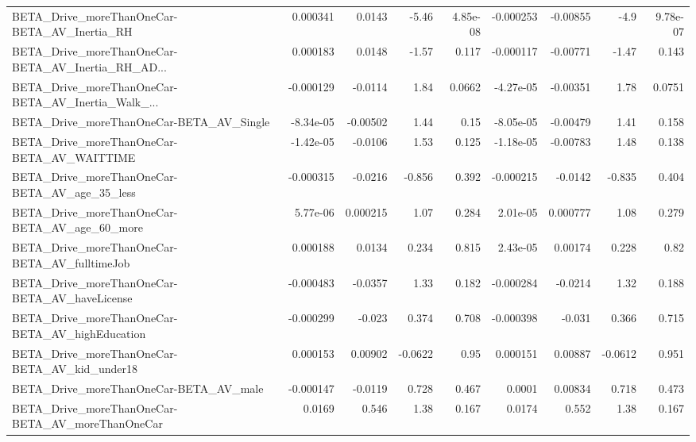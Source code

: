 \begin{tabular}{lrrrrrrrr}
BETA\_Drive\_moreThanOneCar-BETA\_AV\_Inertia\_RH       &    0.000341 &       0.0143 &    -5.46 & 4.85e-08 &  -0.000253 &    -0.00855 &         -4.9 &      9.78e-07 \\
BETA\_Drive\_moreThanOneCar-BETA\_AV\_Inertia\_RH\_AD... &    0.000183 &       0.0148 &    -1.57 &    0.117 &  -0.000117 &    -0.00771 &        -1.47 &         0.143 \\
BETA\_Drive\_moreThanOneCar-BETA\_AV\_Inertia\_Walk\_... &   -0.000129 &      -0.0114 &     1.84 &   0.0662 &  -4.27e-05 &    -0.00351 &         1.78 &        0.0751 \\
BETA\_Drive\_moreThanOneCar-BETA\_AV\_Single           &   -8.34e-05 &     -0.00502 &     1.44 &     0.15 &  -8.05e-05 &    -0.00479 &         1.41 &         0.158 \\
BETA\_Drive\_moreThanOneCar-BETA\_AV\_WAITTIME         &   -1.42e-05 &      -0.0106 &     1.53 &    0.125 &  -1.18e-05 &    -0.00783 &         1.48 &         0.138 \\
BETA\_Drive\_moreThanOneCar-BETA\_AV\_age\_35\_less      &   -0.000315 &      -0.0216 &   -0.856 &    0.392 &  -0.000215 &     -0.0142 &       -0.835 &         0.404 \\
BETA\_Drive\_moreThanOneCar-BETA\_AV\_age\_60\_more      &    5.77e-06 &     0.000215 &     1.07 &    0.284 &   2.01e-05 &    0.000777 &         1.08 &         0.279 \\
BETA\_Drive\_moreThanOneCar-BETA\_AV\_fulltimeJob      &    0.000188 &       0.0134 &    0.234 &    0.815 &   2.43e-05 &     0.00174 &        0.228 &          0.82 \\
BETA\_Drive\_moreThanOneCar-BETA\_AV\_haveLicense      &   -0.000483 &      -0.0357 &     1.33 &    0.182 &  -0.000284 &     -0.0214 &         1.32 &         0.188 \\
BETA\_Drive\_moreThanOneCar-BETA\_AV\_highEducation    &   -0.000299 &       -0.023 &    0.374 &    0.708 &  -0.000398 &      -0.031 &        0.366 &         0.715 \\
BETA\_Drive\_moreThanOneCar-BETA\_AV\_kid\_under18      &    0.000153 &      0.00902 &  -0.0622 &     0.95 &   0.000151 &     0.00887 &      -0.0612 &         0.951 \\
BETA\_Drive\_moreThanOneCar-BETA\_AV\_male             &   -0.000147 &      -0.0119 &    0.728 &    0.467 &     0.0001 &     0.00834 &        0.718 &         0.473 \\
BETA\_Drive\_moreThanOneCar-BETA\_AV\_moreThanOneCar   &      0.0169 &        0.546 &     1.38 &    0.167 &     0.0174 &       0.552 &         1.38 &         0.167 \\

\end{tabular}
